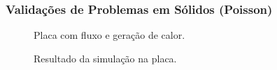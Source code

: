 \documentclass{beamer}
\begin{document}
\begin{frame}
  \frametitle{Validações de Problemas em Sólidos (Poisson)}
  
  \begin{minipage}{.48\textwidth}
    \centering
    \begin{figure}
       {\raggedleft \tiny Placa com fluxo e geração de calor.}
    \end{figure}
  \end{minipage}
  \hfill
  \begin{minipage}{.48\textwidth}
    \begin{figure}
       {\raggedleft \tiny Resultado da simulação na placa.}
    \end{figure}
  \end{minipage}
  

\end{frame}
\end{document}
